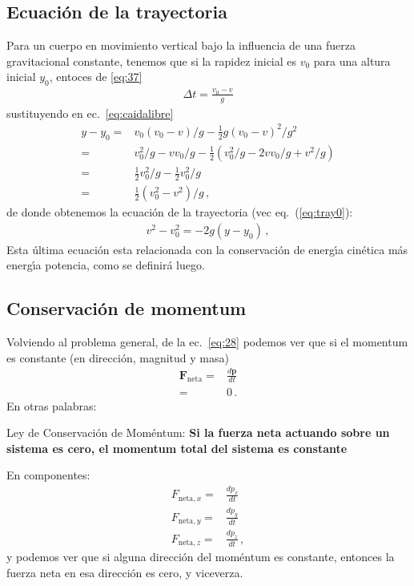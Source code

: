 \subsection{Ecuación de la trayectoria}
Para un cuerpo en movimiento vertical bajo la influencia de una fuerza gravitacional constante, tenemos que si la rapidez inicial es $v_0$ para una altura inicial $y_0$, entoces de \eqref{eq:37}
\begin{align}
  \Delta t=\frac{v_0-v}{g}
\end{align}
sustituyendo en ec.~\eqref{eq:caidalibre}
\begin{align}
  y-y_0=&v_0(v_0-v)/g-\tfrac{1}{2}g(v_0-v)^2/g^2\nonumber\\
       =&v_0^2/g-vv_0/g-\tfrac{1}{2}(v_0^2/g-2vv_0/g+v^2/g)\nonumber\\
       =&\tfrac{1}{2}v_0^2/g-\tfrac{1}{2}v_0^2/g\nonumber\\
       =&\tfrac{1}{2}(v_0^2-v^2)/g\,,
\end{align}
de donde obtenemos la ecuación de la trayectoria (vec eq.~(\ref{eq:tray0}):
\begin{align}
  \label{eq:trayectoriay}
  v^2-v_0^2=-2g(y-y_0)\,,
\end{align}
Esta \'ultima ecuaci\'on esta relacionada con la conservaci\'on de energ\'\i a cin\'etica m\'as energ\'\i a potencia, como se definir\'a luego.


\subsection{Conservación de momentum}
Volviendo al problema general, de la ec.~\eqref{eq:28} podemos ver que si el momentum es constante (en dirección, magnitud y masa)
\begin{align}
  \mathbf{F}_{\text{neta}}=&\frac{d\mathbf{p}}{dt}\nonumber\\
=&0\,.
\end{align}
En otras palabras:
\begin{frame}
  \begin{block}%
{Ley de Conservación de Moméntum:} \textbf{Si la fuerza neta actuando sobre un sistema es cero, el momentum total del sistema es constante}
  \end{block}
\end{frame}

En componentes:
\begin{align}
  F_{\text{neta},x}=&\frac{d p_x}{dt}\nonumber\\
  F_{\text{neta},y}=&\frac{d p_y}{dt}\nonumber\\
  F_{\text{neta},z}=&\frac{d p_z}{dt}\,,
\end{align}
y podemos ver que si alguna dirección del moméntum es constante, entonces la fuerza neta en esa dirección es cero, y viceverza. 

